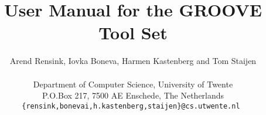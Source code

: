 \title{User Manual for the GROOVE Tool Set}
\author{Arend Rensink, Iovka Boneva, Harmen Kastenberg and Tom Staijen \\
%
\vspace{0.2in} \\
%
Department of Computer Science, University of Twente \\
P.O.Box 217, 7500 AE Enschede, The Netherlands \\
\tt{\{rensink,bonevai,h.kastenberg,staijen\}@cs.utwente.nl}
}
\maketitle

\tableofcontents

